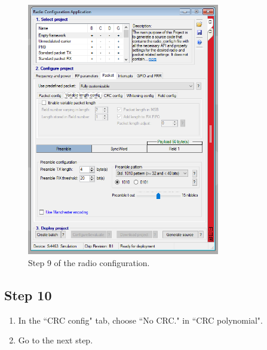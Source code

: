 \documentclass[12pt]{book}
\begin{document}
\begin{appendices}
\begin{figure}[!h]
	\begin{center}
		\includegraphics[width=0.75\textwidth]{figures/wds-tutorial-9.png}
		\caption{Step 9 of the radio configuration.}
		\label{fig:wds-tutorial-step-9}
	\end{center}
\end{figure}

\subsection{Step 10}

\begin{enumerate}
    \item In the ``CRC config" tab, choose ``No CRC." in ``CRC polynomial".
    \item Go to the next step.
\end{enumerate}


\end{appendices}
\end{document}
